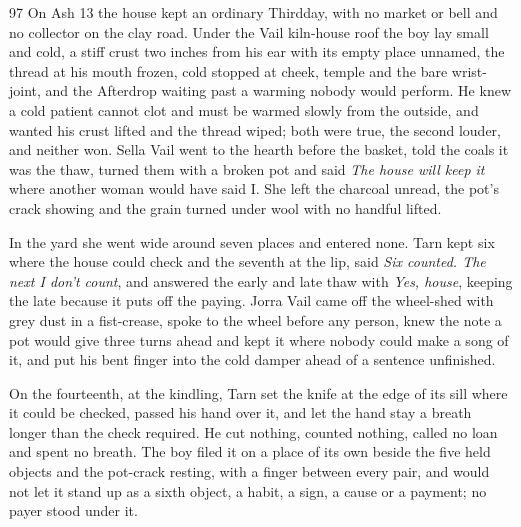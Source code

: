 
\scenebreak


\scenebreak


\scenebreak

\CRtailpiece
\begin{CRchronicle}{97}
On Ash 13 the house kept an ordinary Thirdday, with no market or bell and no collector on the clay road. Under the Vail kiln-house roof the boy lay small and cold, a stiff crust two inches from his ear with its empty place unnamed, the thread at his mouth frozen, cold stopped at cheek, temple and the bare wrist-joint, and the Afterdrop waiting past a warming nobody would perform. He knew a cold patient cannot clot and must be warmed slowly from the outside, and wanted his crust lifted and the thread wiped; both were true, the second louder, and neither won. Sella Vail went to the hearth before the basket, told the coals it was the thaw, turned them with a broken pot and said \emph{The house will keep it} where another woman would have said I. She left the charcoal unread, the pot’s crack showing and the grain turned under wool with no handful lifted.

In the yard she went wide around seven places and entered none. Tarn kept six where the house could check and the seventh at the lip, said \emph{Six counted. The next I don’t count}, and answered the early and late thaw with \emph{Yes, house}, keeping the late because it puts off the paying. Jorra Vail came off the wheel-shed with grey dust in a fist-crease, spoke to the wheel before any person, knew the note a pot would give three turns ahead and kept it where nobody could make a song of it, and put his bent finger into the cold damper ahead of a sentence unfinished.

On the fourteenth, at the kindling, Tarn set the knife at the edge of its sill where it could be checked, passed his hand over it, and let the hand stay a breath longer than the check required. He cut nothing, counted nothing, called no loan and spent no breath. The boy filed it on a place of its own beside the five held objects and the pot-crack resting, with a finger between every pair, and would not let it stand up as a sixth object, a habit, a sign, a cause or a payment; no payer stood under it.


\end{CRchronicle}
